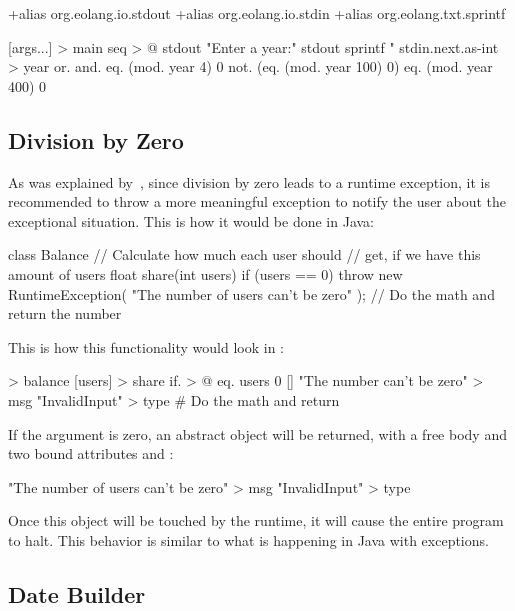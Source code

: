 \begin{ffcode}
+alias org.eolang.io.stdout
+alias org.eolang.io.stdin
+alias org.eolang.txt.sprintf

[args...] > main
  seq > @
    stdout
      "Enter a year:"
    stdout
      sprintf
        "%
        stdin.next.as-int > year
        or.
          and.
            eq. (mod. year 4) 0
            not. (eq. (mod. year 100) 0)
          eq. (mod. year 400) 0
\end{ffcode}

\subsection{Division by Zero}

As was explained by~\citet[p.314]{eckel2006thinking}, since division by zero
leads to a runtime exception, it is recommended to throw a more meaningful
exception to notify the user about the exceptional situation. This is how
it would be done in Java:

\begin{ffcode}
class Balance {
  // Calculate how much each user should
  // get, if we have this amount of users
  float share(int users) {
    if (users == 0) {
      throw new RuntimeException(
        "The number of users can't be zero"
      );
    }
    // Do the math and return the number
  }
}
\end{ffcode}

This is how this functionality would look in \eo{}:

\begin{ffcode}
[] > balance
  [users] > share
    if. > @
      eq. users 0
      []
        "The number can't be zero" > msg
        "InvalidInput" > type
      # Do the math and return
\end{ffcode}

If the  argument is zero, an abstract object
will be returned, with a free body and two bound attributes
 and :

\begin{ffcode}
[]
  "The number of users can't be zero" > msg
  "InvalidInput" > type
\end{ffcode}

Once this object will be touched by the runtime, it will cause
the entire program to halt. This behavior is similar to what
is happening in Java with exceptions.

\subsection{Date Builder}

